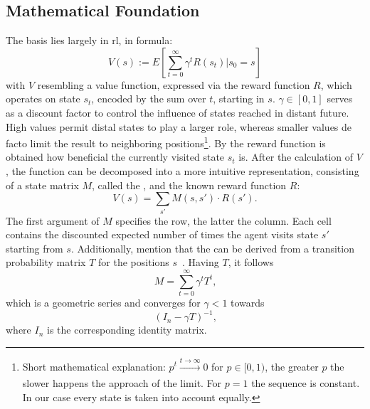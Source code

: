 \subsection{Mathematical Foundation}
The basis lies largely in \gls{rl}, in formula:
\begin{equation}\label{eq: rl}
	V(s) := E \left[
				\sum_{t=0}^{\infty}
					\gamma^t R(s_t) | s_0 = s
			\right]
\end{equation}
with $ V $ resembling a value function, expressed via the reward function $ R $, which operates on state $ s_t $, encoded by the sum over $ t $, starting in $ s $. $ \gamma \in [0,1] $ serves as a discount factor to control the influence of states reached in distant future. High values permit distal states to play a larger role, whereas smaller values de facto limit the result to neighboring positions\footnote{Short mathematical explanation: $ p^t \xrightarrow[]{t \to \infty} 0 $ for $ p \in [0,1) $, the greater $ p $ the slower happens the approach of the limit. For $ p = 1 $ the sequence is constant. In our case every state is taken into account equally.}. By the reward function is obtained how beneficial the currently visited state $ s_t $ is. %
After the calculation of $ V $, the function can be decomposed into a more intuitive representation, consisting of a state matrix $ M $, called the \srmat{}, and the known reward function $ R $:
\begin{equation}\label{eq: v with sr-matrix}
	V(s) = \sum_{s'}
				M(s, s') \cdot R(s')
	\text{.}
\end{equation}
The first argument of $ M $ specifies the row, the latter the column. Each cell contains the discounted expected number of times the agent visits state $ s' $ starting from $ s $. Additionally,  mention that the \srmat{} can be derived from a transition probability matrix $ T $ for the positions $ s $~\cite{StBoGe17HPM}. Having $ T $, it follows
\begin{equation}\label{eq: sr or m via T}
	M = \sum_{t = 0}^{\infty}
			\gamma^t T^t
	\text{,}
\end{equation}
which is a geometric series and converges for $ \gamma < 1 $ towards
\begin{equation}\label{eq: geo series}
	(I_n - \gamma T)^{-1}
	\text{,}
\end{equation}
where $ I_n $ is the corresponding identity matrix.

